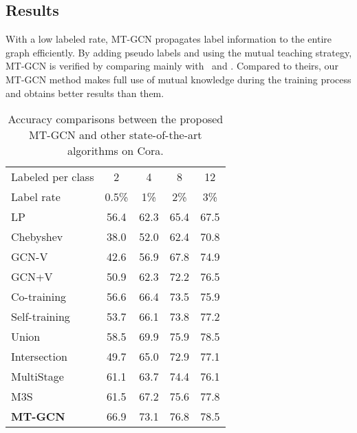 \documentclass{article}
\begin{document}
\subsection{Results}
With a low labeled rate, MT-GCN propagates label information to the entire graph efficiently. By adding pseudo labels and using the mutual teaching strategy,  MT-GCN is verified by comparing mainly with~\cite{li2018deeper} and \cite{sun2019multi}. Compared to theirs, our MT-GCN method makes full use of mutual knowledge during the training process and obtains better results than them.
\begin{table}[!ht]
\caption{Accuracy comparisons between the proposed MT-GCN and other state-of-the-art algorithms on Cora.}
\label{cora}
\centering
\begin{tabular}{l|cccc}
\hline
Labeled per class&2     & 4     & 8     & 12    \\
Label rate      &0.5\%  & 1\%   & 2\%   & 3\%   \\
\hline
LP              &56.4   &62.3   &65.4   &67.5   \\
Chebyshev       &38.0   &52.0   &62.4   &70.8   \\
GCN-V           &42.6   &56.9   &67.8   &74.9   \\
GCN+V           &50.9   &62.3   &72.2   &76.5   \\
Co-training     &56.6   &66.4   &73.5   &75.9   \\
Self-training   &53.7   &66.1   &73.8   &77.2   \\
Union           &58.5   &69.9   &75.9   &78.5   \\
Intersection    &49.7   &65.0   &72.9   &77.1   \\
MultiStage      &61.1   &63.7   &74.4   &76.1   \\
M3S             &61.5   &67.2   &75.6   &77.8   \\
\bf MT-GCN      &66.9   &73.1   &76.8   &78.5   \\
\hline
\end{tabular}
\end{table}
\end{document}
